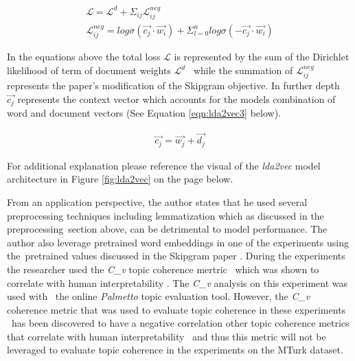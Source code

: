 \documentclass[letterpaper,12pt]{article}
\begin{document}
\begin{eqnarray}
	\label{eqn:lda2vec1}
		\mathcal{L} = \mathcal{L}^d +\Sigma_{ij} \mathcal{L}^{neg}_{ij}  \\
	\label{eqn:lda2vec2}
	\mathcal{L}^{neg}_{ij} = log \sigma (\vec{c_j} \cdot \vec{w_i}) + \Sigma^n_{l=0} log \sigma (-\vec{c_j} \cdot \vec{w_i})
\end{eqnarray}

In the equations above the total loss $\mathcal{L}$ is represented by the sum of the Dirichlet likelihood of term of document weights $\mathcal{L}^d$ \
while the summation of $\mathcal{L}^{neg}_{ij}$ represents the paper's modification of the Skipgram objective. In further depth \
$\vec{c_j}$ represents the context vector which accounts for the models combination of word and document vectors (See Equation \ref{eqn:lda2vec3} below).

\begin{eqnarray}
	\label{eqn:lda2vec3}
	\vec{c_j} = \vec{w_j} + \vec{d_j}
\end{eqnarray}

For additional explanation please reference the visual of the \emph{lda2vec} model architecture in Figure \ref{fig:lda2vec} on the page below.


\newpage
From an application perspective, the author states that he used several preprocessing techniques including lemmatization which as discussed in the preprocessing\
section above, can be detrimental to model performance. The author also leverage pretrained word embeddings in one of the experiments using the\
pretrained values discussed in the Skipgram paper \cite{mikolov2013distributed}. During the experiments the researcher used the \emph{C\_v} topic coherence mertric \
which was shown to correlate with human interpretability \cite{roder2015exploring}. The \emph{C\_v} analysis on this experiment was used with \
the online \emph{Palmetto} \cite{palmetto} topic evaluation tool. However, the \emph{C\_v} coherence metric that was used to evaluate topic coherence in these experiments \
has been discovered to have a negative correlation other topic coherence metrics \cite{palmetto} that correlate with human interpretability \cite{mimno2011optimizing} \cite{newman2010automatic}\
and thus this metric will not be leveraged to evaluate topic coherence in the experiments on the MTurk dataset.
\end{document}
